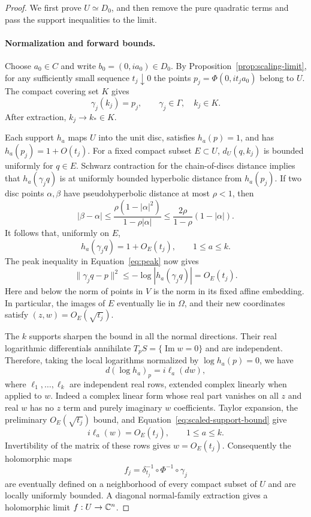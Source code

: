 \begin{proof}
We first prove $U\simeq D_0$, and then remove the pure quadratic terms
and pass the support inequalities to the limit.

\paragraph{Normalization and forward bounds.}
Choose $a_0\in C$ and write $b_0=(0,ia_0)\in D_0$.  By
Proposition~\ref{prop:scaling-limit}, for any sufficiently small sequence
$t_j\downarrow0$ the points
$p_j=\Phi(0,it_ja_0)$ belong to $U$.  The compact covering set $K$ gives
\[
 \gamma_j(k_j)=p_j,\qquad \gamma_j\in\Gamma,\quad k_j\in K.
\]
After extraction, $k_j\to k_*\in K$.

Each support $h_a$ maps $U$ into the unit disc, satisfies $h_a(p)=1$, and
has $h_a(p_j)=1+O(t_j)$.  For a fixed compact subset $E\subset U$,
$d_U(q,k_j)$ is bounded uniformly for $q\in E$.  Schwarz contraction
for the chain-of-discs distance implies that
$h_a(\gamma_jq)$ is at uniformly bounded hyperbolic distance from
$h_a(p_j)$.  If two disc points $\alpha,\beta$ have pseudohyperbolic
distance at most $\rho<1$, then
\[
 |\beta-\alpha|
 \le \frac{\rho(1-|\alpha|^2)}{1-\rho|\alpha|}
 \le \frac{2\rho}{1-\rho}(1-|\alpha|).
\]
It follows that, uniformly on $E$,
\begin{equation}
\label{eq:scaled-support-bound}
 h_a(\gamma_jq)=1+O_E(t_j),\qquad 1\le a\le k.
\end{equation}
The peak inequality in Equation~\eqref{eq:peak} now gives
\[
 \lVert\gamma_jq-p\rVert^2
 \le -\log|h_a(\gamma_jq)|=O_E(t_j).
\]
Here and below the norm of points in $V$ is the norm in its fixed affine
embedding.  In particular, the images of $E$ eventually lie in $\Omega$,
and their new coordinates satisfy $(z,w)=O_E(\sqrt{t_j})$.

The $k$ supports sharpen the bound in all the normal directions.
Their real logarithmic differentials annihilate
$T_pS=\{\operatorname{Im}w=0\}$ and are independent.  Therefore, taking
the local logarithms normalized by $\log h_a(p)=0$, we have
\begin{equation}
\label{eq:normal-linear-supports}
 d(\log h_a)_p=i\ell_a(dw),
\end{equation}
where $\ell_1,\ldots,\ell_k$ are independent real rows, extended
complex linearly when applied to $w$.  Indeed a complex linear form whose
real part vanishes on all $z$ and real $w$ has no $z$ term and purely
imaginary $w$ coefficients.  Taylor expansion, the preliminary
$O_E(\sqrt{t_j})$ bound, and
Equation~\eqref{eq:scaled-support-bound} give
\[
 i\ell_a(w)=O_E(t_j),\qquad 1\le a\le k.
\]
Invertibility of the matrix of these rows gives $w=O_E(t_j)$.
Consequently the holomorphic maps
\[
 f_j=\delta_{t_j}^{-1}\circ\Phi^{-1}\circ\gamma_j
\]
are eventually defined on a neighborhood of every compact subset of $U$
and are locally uniformly bounded.  A diagonal normal-family extraction
gives a holomorphic limit $f:U\to\mathbb C^n$.


\end{proof}
